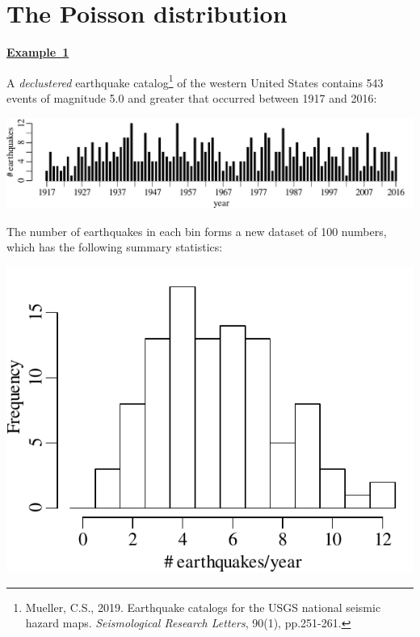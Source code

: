 \chapter{The Poisson distribution}
\label{ch:poisson}

\textbf{\underline{Example~1}}\medskip

A \emph{declustered} earthquake catalog\footnote{Mueller, C.S.,
  2019. Earthquake catalogs for the USGS national seismic hazard
  maps. \textit{Seismological Research Letters}, 90(1), pp.251-261.}
of the western United States contains 543 events of magnitude 5.0 and
greater that occurred between 1917 and 2016:\medskip

\noindent\includegraphics[]{../figures/declusteredquakes.pdf}
\begingroup {}
\label{fig:declusteredquakes}
\endgroup

The number of earthquakes in each bin forms a new dataset of 100
numbers, which has the following summary statistics:

\noindent\begin{minipage}[t][][b]{.4\textwidth}
\includegraphics[]{../figures/declusteredquakesperyear.pdf}
\medskip
\end{minipage}
\begin{minipage}[t][][t]{.6\textwidth}
  \label{fig:declusteredquakesperyear}
\end{minipage}

